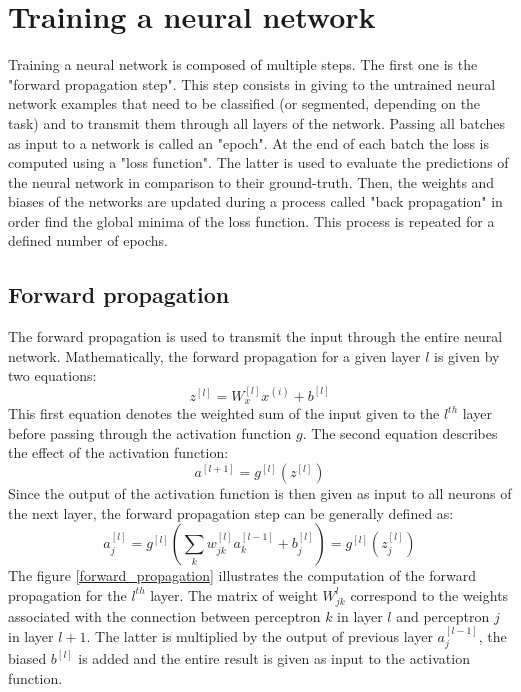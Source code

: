 \section{Training a neural network}
\label{training_a_neural_network}
Training a neural network is composed of multiple steps. The first one is the "forward propagation step". This step consists in giving to the untrained neural network examples that need to be classified (or segmented, depending on the task) and to transmit them through all layers of the network. Passing all batches as input to a network is called an "epoch". At the end of each batch the loss is computed using a "loss function". The latter is used to evaluate the predictions of the neural network in comparison to their ground-truth. Then, the weights and biases of the networks are updated during a process called "back propagation" in order find the global minima of the loss function. This process is repeated for a defined number of epochs.



\subsection{Forward propagation}
The forward propagation is used to transmit the input through the entire neural network. Mathematically, the forward propagation for a given layer $l$ is given by two equations:
\begin{equation}
z^{[l]} = W_{x}^{[l]}x^{(i)} + b^{[l]}
\end{equation}
This first equation denotes the weighted sum of the input given to the $l^{th}$ layer before passing through the activation function $g$. The second equation describes the effect of the activation function:
\begin{equation}
a^{[l+1]} = g^{[l]}(z^{[l]})
\end{equation}
Since the output of the activation function is then given as input to all neurons of the next layer, the forward propagation step can be generally defined as:
\begin{equation}
a_{j}^{[l]} = g^{[l]} (\sum_{k} w_{jk}^{[l]}a_{k}^{[l-1]} + b_{j}^{[l]}) = g^{[l]} (z_{j}^{[l]}) 
\end{equation}
The figure \ref{forward_propagation} illustrates the computation of the forward propagation for the $l^{th}$ layer. The matrix of weight $W_{jk}^{l}$ correspond to the weights associated with the connection between perceptron $k$ in layer $l$ and perceptron $j$ in layer $l+1$. The latter is multiplied by the output of previous layer $a_{j}^{[l-1]}$, the biased $b^{[l]}$ is added and the entire result is given as input to the activation function.

